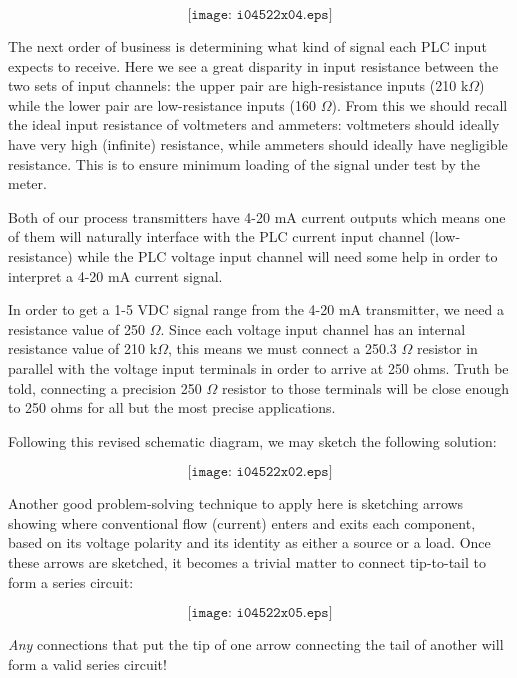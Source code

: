 $$\texttt{[image: i04522x04.eps]}$$

The next order of business is determining what kind of signal each PLC input expects to receive.  Here we see a great disparity in input resistance between the two sets of input channels: the upper pair are high-resistance inputs (210 k$\Omega$) while the lower pair are low-resistance inputs (160 $\Omega$).  From this we should recall the ideal input resistance of voltmeters and ammeters: voltmeters should ideally have very high (infinite) resistance, while ammeters should ideally have negligible resistance.  This is to ensure minimum loading of the signal under test by the meter.

Both of our process transmitters have 4-20 mA current outputs which means one of them will naturally interface with the PLC current input channel (low-resistance) while the PLC voltage input channel will need some help in order to interpret a 4-20 mA current signal.

In order to get a 1-5 VDC signal range from the 4-20 mA transmitter, we need a resistance value of 250 $\Omega$.  Since each voltage input channel has an internal resistance value of 210 k$\Omega$, this means we must connect a 250.3 $\Omega$ resistor in parallel with the voltage input terminals in order to arrive at 250 ohms.  Truth be told, connecting a precision 250 $\Omega$ resistor to those terminals will be close enough to 250 ohms for all but the most precise applications.

\vskip 10pt

\filbreak

Following this revised schematic diagram, we may sketch the following solution:

$$\texttt{[image: i04522x02.eps]}$$

\filbreak

Another good problem-solving technique to apply here is sketching arrows showing where conventional flow (current) enters and exits each component, based on its voltage polarity and its identity as either a source or a load.  Once these arrows are sketched, it becomes a trivial matter to connect tip-to-tail to form a series circuit:

$$\texttt{[image: i04522x05.eps]}$$

{\it Any} connections that put the tip of one arrow connecting the tail of another will form a valid series circuit!





